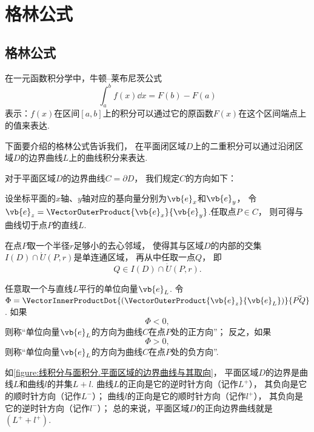 \section{格林公式}
\subsection{格林公式}
在一元函数积分学中，牛顿--莱布尼茨公式\[
	\int_a^b f(x) \dd{x} = F(b) - F(a)
\]表示：\(f(x)\)在区间\([a,b]\)上的积分可以通过它的原函数\(F(x)\)在这个区间端点上的值来表达.

下面要介绍的格林公式告诉我们，
在平面闭区域\(D\)上的二重积分可以通过沿闭区域\(D\)的边界曲线\(L\)上的曲线积分来表达.

\begin{definition}\label{definition:线积分与面积分.平面闭区域的边界曲线的取向}
对于平面区域\(D\)的边界曲线\(C = \partial D\)，
我们规定\(C\)的方向如下：

设坐标平面的\(x\)轴、\(y\)轴对应的基向量分别为\(\vb{e}_x\)和\(\vb{e}_y\)，
令\(\vb{e}_z = \VectorOuterProduct{\vb{e}_x}{\vb{e}_y}\).任取点\(P \in C\)，
则可得与曲线切于点\(P\)的直线\(L\).

在点\(P\)取一个半径\(r\)足够小的去心邻域，
使得其与区域\(D\)的内部的交集\(I(D) \cap \mathring{U}(P,r)\)是单连通区域，
再从中任取一点\(Q\)，
即\[
	Q \in I(D) \cap \mathring{U}(P,r).
\]

任意取一个与直线\(L\)平行的单位向量\(\vb{e}_L\).
令\(\Phi = \VectorInnerProductDot{(\VectorOuterProduct{\vb{e}_z}{\vb{e}_L})}{\vec{PQ}}\).
如果\[
	\Phi < 0,
\]
则称“单位向量\(\vb{e}_L\)的方向为曲线\(C\)在点\(P\)处的正方向”；
反之，如果\[
	\Phi > 0,
\]
则称“单位向量\(\vb{e}_L\)的方向为曲线\(C\)在点\(P\)处的负方向”.
\end{definition}
如\cref{figure:线积分与面积分.平面区域的边界曲线与其取向}，
平面区域\(D\)的边界是曲线\(L\)和曲线\(l\)的并集\(L+l\).
曲线\(L\)的正向是它的逆时针方向（记作\(L^+\)），
其负向是它的顺时针方向（记作\(L^-\)）；
曲线\(l\)的正向是它的顺时针方向（记作\(l^+\)），
其负向是它的逆时针方向（记作\(l^-\)）；
总的来说，平面区域\(D\)的正向边界曲线就是\((L^+ + l^+)\).

